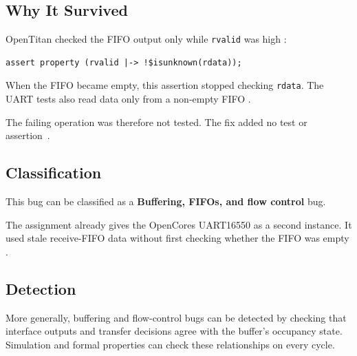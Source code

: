 \documentclass[conference]{IEEEtran}
\begin{document}

\subsection{Why It Survived}

OpenTitan checked the FIFO output only while \texttt{rvalid} was high
\cite{fifo-parent,fifo-issue,fifo-fix}:

\begin{lstlisting}
assert property (rvalid |-> !$isunknown(rdata));
\end{lstlisting}

When the FIFO became empty, this assertion stopped checking \texttt{rdata}.
The UART tests also read data only from a non-empty FIFO
\cite{uart-testplan,uart-scoreboard}.

The failing operation was therefore not tested. The fix added no test or
assertion~\cite{fifo-fix}.




\subsection{Classification}

This bug can be classified as a \textbf{Buffering, FIFOs, and flow control} bug.

The assignment already gives the OpenCores UART16550 as a second instance. It
used stale receive-FIFO data without first checking whether the FIFO was empty
\cite{uart16550-stale}.




\subsection{Detection}

More generally, buffering and flow-control bugs can be detected by checking
that interface outputs and transfer decisions agree with the buffer's occupancy
state. Simulation and formal properties can check these relationships on every
cycle.
\end{document}

